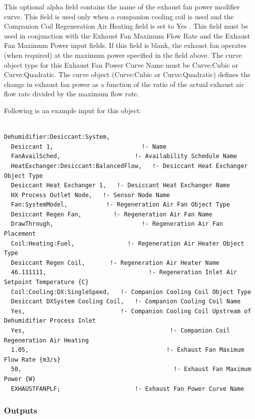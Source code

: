 This optional alpha field contains the name of the exhaust fan power modifier curve. This field is used only when a companion cooling coil is used and the Companion Coil Regeneration Air Heating field is set to Yes . This field must be used in conjunction with the Exhaust Fan Maximum Flow Rate and the Exhaust Fan Maximum Power input fields. If this field is blank, the exhaust fan operates (when required) at the maximum power specified in the field above. The curve object type for this Exhaust Fan Power Curve Name must be Curve:Cubic or Curve:Quadratic. The curve object (Curve:Cubic or Curve:Quadratic) defines the change in exhaust fan power as a function of the ratio of the actual exhaust air flow rate divided by the maximum flow rate.

Following is an example input for this object:

\begin{lstlisting}

Dehumidifier:Desiccant:System,
  Desiccant 1,                         !- Name
  FanAvailSched,                     !- Availability Schedule Name
  HeatExchanger:Desiccant:BalancedFlow,   !- Desiccant Heat Exchanger Object Type
  Desiccant Heat Exchanger 1,   !- Desiccant Heat Exchanger Name
  HX Process Outlet Node,   !- Sensor Node Name
  Fan:SystemModel,           !- Regeneration Air Fan Object Type
  Desiccant Regen Fan,         !- Regeneration Air Fan Name
  DrawThrough,                         !- Regeneration Air Fan Placement
  Coil:Heating:Fuel,               !- Regeneration Air Heater Object Type
  Desiccant Regen Coil,       !- Regeneration Air Heater Name
  46.111111,                             !- Regeneration Inlet Air Setpoint Temperature {C}
  Coil:Cooling:DX:SingleSpeed,   !- Companion Cooling Coil Object Type
  Desiccant DXSystem Cooling Coil,   !- Companion Cooling Coil Name
  Yes,                           !- Companion Cooling Coil Upstream of Dehumidifier Process Inlet
  Yes,                                         !- Companion Coil Regeneration Air Heating
  1.05,                                       !- Exhaust Fan Maximum Flow Rate {m3/s}
  50,                                           !- Exhaust Fan Maximum Power {W}
  EXHAUSTFANPLF;                     !- Exhaust Fan Power Curve Name
\end{lstlisting}

\subsubsection{Outputs}\label{outputs-1-006}

